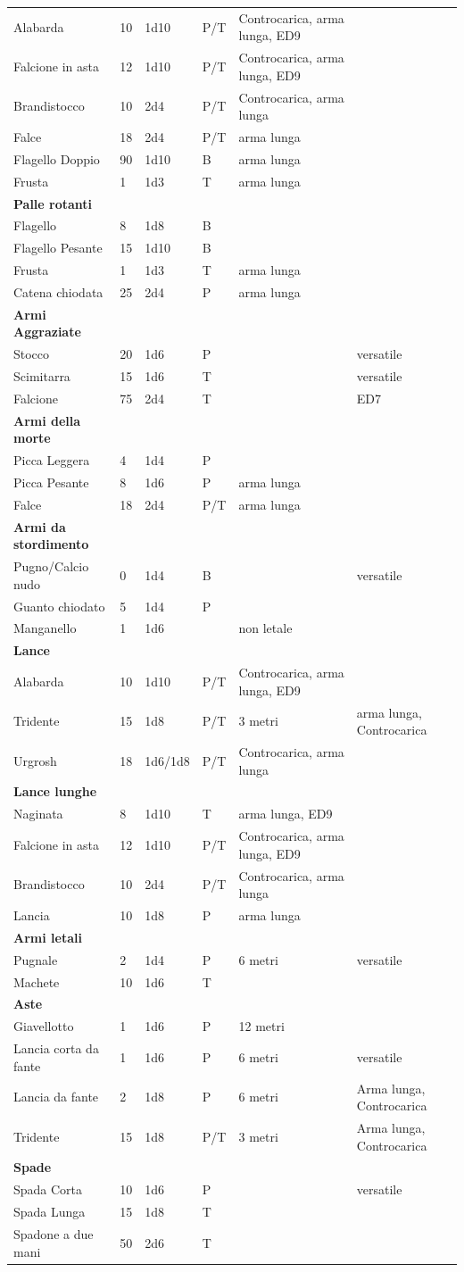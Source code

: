 \documentclass[a4paper,11pt,twoside,openany]{dndbook}
\begin{document}
{\begin{longtable}{|L{3.5cm} |k{1cm} |k{1.5cm}| k{1cm} |L{4.5cm} |k{3cm}|}
	Alabarda & 10 & 1d10 & P/T & Controcarica, arma lunga, ED9 & \tabularnewline
	Falcione in asta & 12 & 1d10 & P/T & Controcarica, arma lunga, ED9 & \tabularnewline
	Brandistocco & 10 & 2d4 & P/T & Controcarica, arma lunga & \tabularnewline
	Falce & 18 & 2d4 & P/T & arma lunga & \tabularnewline
	Flagello Doppio & 90 & 1d10 & B & arma lunga & \tabularnewline
	Frusta & 1 & 1d3 & T & arma lunga & \tabularnewline
	\textbf{Palle rotanti} & & & & & \tabularnewline
	Flagello & 8 & 1d8 & B & & \tabularnewline
	Flagello Pesante & 15 & 1d10 & B & & \tabularnewline
	Frusta & 1 & 1d3 & T & arma lunga & \tabularnewline
	Catena chiodata & 25 & 2d4 & P & arma lunga & \tabularnewline
	\textbf{Armi Aggraziate} & & & & & \tabularnewline
	Stocco & 20 & 1d6 & P & & versatile\tabularnewline
	Scimitarra & 15 & 1d6 & T & & versatile\tabularnewline
	Falcione & 75 & 2d4 & T & & ED7\tabularnewline
	\textbf{Armi della morte} & & & & & \tabularnewline
	Picca Leggera & 4 & 1d4 & P & & \tabularnewline
	Picca Pesante & 8 & 1d6 & P & arma lunga & \tabularnewline
	Falce & 18 & 2d4 & P/T & arma lunga & \tabularnewline
	\textbf{Armi da stordimento} & & & & & \tabularnewline
	Pugno/Calcio nudo & 0 & 1d4 & B & & versatile\tabularnewline
	Guanto chiodato & 5 & 1d4 & P & & \tabularnewline
	Manganello & 1 & 1d6 & & non letale & \tabularnewline
	\textbf{Lance} & & & & & \tabularnewline
	Alabarda & 10 & 1d10 & P/T & Controcarica, arma lunga, ED9 & \tabularnewline
	Tridente & 15 & 1d8 & P/T & 3 metri & arma lunga, Controcarica \tabularnewline
	Urgrosh & 18 & 1d6/1d8 & P/T & Controcarica, arma lunga & \tabularnewline
	\textbf{Lance lunghe} & & & & & \tabularnewline
	Naginata & 8 & 1d10 & T & arma lunga, ED9 & \tabularnewline
	Falcione in asta & 12 & 1d10 & P/T & Controcarica, arma lunga, ED9 & \tabularnewline
	Brandistocco & 10 & 2d4 & P/T & Controcarica, arma lunga & \tabularnewline
	Lancia & 10 & 1d8 & P & arma lunga & \tabularnewline
	\textbf{Armi letali} & & & & & \tabularnewline
	Pugnale & 2 & 1d4 & P & 6 metri & versatile\tabularnewline
	Machete & 10 & 1d6 & T & & \tabularnewline
	\textbf{Aste} & & & & & \tabularnewline
	Giavellotto & 1 & 1d6 & P & 12 metri & \tabularnewline
	Lancia corta da fante & 1 & 1d6 & P & 6 metri & versatile\tabularnewline
	Lancia da fante & 2 & 1d8 & P & 6 metri &Arma lunga, Controcarica \tabularnewline
	Tridente & 15 & 1d8 & P/T & 3 metri & Arma lunga, Controcarica \tabularnewline
	\textbf{Spade} & & & & & \tabularnewline
	Spada Corta & 10 & 1d6 & P & & versatile\tabularnewline
	Spada Lunga & 15 & 1d8 & T & & \tabularnewline
	Spadone a due mani & 50 & 2d6 & T & & \tabularnewline

\end{longtable}}
\end{document}
